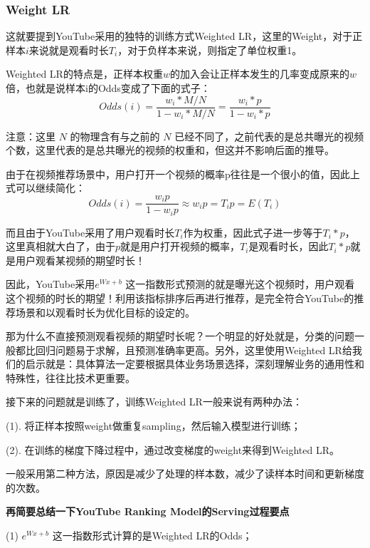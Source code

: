 \documentclass[12pt]{article}
\begin{document}
\subsubsection{Weight LR}
这就要提到YouTube采用的独特的训练方式Weighted LR，这里的Weight，对于正样本$i$来说就是观看时长$T_i$，对于负样本来说，则指定了单位权重1。

Weighted LR的特点是，正样本权重$w$的加入会让正样本发生的几率变成原来的$w$倍，也就是说样本i的Odds变成了下面的式子：
$$
Odds(i) = \frac{w_i * M/N}{ 1 - w_i*M/N} = \frac{w_i*p}{1 - w_i*p}
$$

\begin{framed}
注意：这里 $N$ 的物理含有与之前的 $N$ 已经不同了，之前代表的是总共曝光的视频个数，这里代表的是总共曝光的视频的权重和，但这并不影响后面的推导。
\end{framed}

由于在视频推荐场景中，用户打开一个视频的概率p往往是一个很小的值，因此上式可以继续简化：
$$
Odds(i) = \frac{w_ip}{1-w_ip} \approx w_ip = T_ip = E(T_i)
$$

而且由于YouTube采用了用户观看时长$T_i$作为权重，因此式子进一步等于$T_i*p$，这里真相就大白了，由于$p$就是用户打开视频的概率，$T_i$是观看时长，因此$T_i*p$就是用户观看某视频的期望时长！

因此，YouTube采用$e^{Wx+b}$ 这一指数形式预测的就是曝光这个视频时，用户观看这个视频的时长的期望！利用该指标排序后再进行推荐，是完全符合YouTube的推荐场景和以观看时长为优化目标的设定的。

\begin{framed}
那为什么不直接预测观看视频的期望时长呢？一个明显的好处就是，分类的问题一般都比回归问题易于求解，且预测准确率更高。另外，这里使用Weighted LR给我们的启示就是：具体算法一定要根据具体业务场景选择，深刻理解业务的通用性和特殊性，往往比技术更重要。
\end{framed}

\begin{framed}
接下来的问题就是训练了，训练Weighted LR一般来说有两种办法：

(1). 将正样本按照weight做重复sampling，然后输入模型进行训练；

(2). 在训练的梯度下降过程中，通过改变梯度的weight来得到Weighted LR。

一般采用第二种方法，原因是减少了处理的样本数，减少了读样本时间和更新梯度的次数。
\end{framed}

\textbf{再简要总结一下YouTube Ranking Model的Serving过程要点}

(1) $e^{Wx+b}$  这一指数形式计算的是Weighted LR的Odds；
\end{document}
